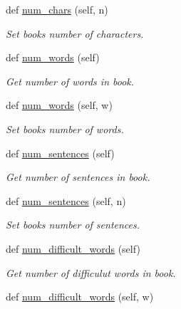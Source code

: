 \begin{DoxyCompactItemize}
def \hyperlink{classbridges_1_1data__src__dependent_1_1gutenberg__book_1_1_gutenberg_book_a825a9ca87358eb103a46ce5082a13490}{num\+\_\+chars} (self, n)
\begin{DoxyCompactList}\small\item\em Set book\textquotesingle{}s number of characters. \end{DoxyCompactList}\item 
def \hyperlink{classbridges_1_1data__src__dependent_1_1gutenberg__book_1_1_gutenberg_book_ad1c456583f386fbd40230d07b43f467f}{num\+\_\+words} (self)
\begin{DoxyCompactList}\small\item\em Get number of words in book. \end{DoxyCompactList}\item 
def \hyperlink{classbridges_1_1data__src__dependent_1_1gutenberg__book_1_1_gutenberg_book_a66404c75698fe5fdea39fced63652af4}{num\+\_\+words} (self, w)
\begin{DoxyCompactList}\small\item\em Set book\textquotesingle{}s number of words. \end{DoxyCompactList}\item 
def \hyperlink{classbridges_1_1data__src__dependent_1_1gutenberg__book_1_1_gutenberg_book_a9f206d0c36bf4e0956d78bc3bf951ab4}{num\+\_\+sentences} (self)
\begin{DoxyCompactList}\small\item\em Get number of sentences in book. \end{DoxyCompactList}\item 
def \hyperlink{classbridges_1_1data__src__dependent_1_1gutenberg__book_1_1_gutenberg_book_a38ca770a1e4f460f3b73a1d50e1f52f8}{num\+\_\+sentences} (self, n)
\begin{DoxyCompactList}\small\item\em Set book\textquotesingle{}s number of sentences. \end{DoxyCompactList}\item 
def \hyperlink{classbridges_1_1data__src__dependent_1_1gutenberg__book_1_1_gutenberg_book_a5f616c4e018f44da77a861db528103fa}{num\+\_\+difficult\+\_\+words} (self)
\begin{DoxyCompactList}\small\item\em Get number of difficulut words in book. \end{DoxyCompactList}\item 
def \hyperlink{classbridges_1_1data__src__dependent_1_1gutenberg__book_1_1_gutenberg_book_aceaae959361c8c9c2f2cddf7fa71e5eb}{num\+\_\+difficult\+\_\+words} (self, w)

\end{DoxyCompactItemize}

